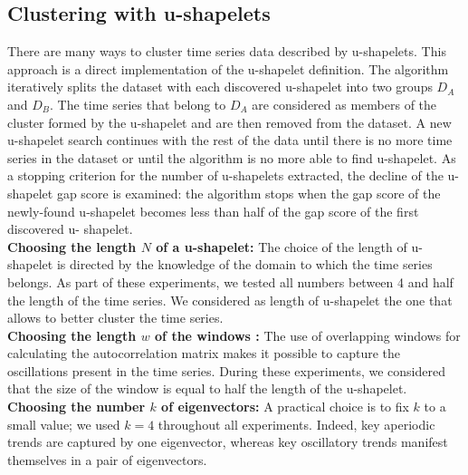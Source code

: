 \subsection{Clustering with u-shapelets}
There are many ways to cluster time series data described by u-shapelets. This approach is a direct implementation of the u-shapelet definition. The algorithm iteratively splits the dataset with each discovered u-shapelet into two groups $D_A$ and $D_B$. The time series that belong to $D_A$ are considered as members of the cluster formed by the u-shapelet and are then removed from the dataset. A new u-shapelet search continues with the rest of the data until there is no more time series in the dataset or until the algorithm is no more able to find u-shapelet. As a stopping criterion for the number of u-shapelets extracted, the decline of the u-shapelet gap score is examined: the algorithm stops when the gap score of the newly-found u-shapelet becomes less than half of the gap score of the first discovered u- shapelet. 
\\
\textbf{Choosing the length $N$ of a u-shapelet: }
The choice of the length of u-shapelet is directed by the knowledge of the
domain to which the time series belongs. As part of these experiments, we tested all  numbers between 4 and half the length of the time series. We considered as length of u-shapelet the one that allows to better cluster the time series.
\\
\textbf{Choosing the length $w$ of the windows : }
The use of overlapping windows for calculating the autocorrelation matrix makes
it possible to capture the oscillations present in the time series. During these experiments, we considered that the size of the window is equal to half the length of the u-shapelet.
\\
\textbf{Choosing  the number $k$ of eigenvectors: }
A practical choice is to fix $k$ to a small value; we used $k = 4$ throughout all
experiments. Indeed, key aperiodic trends are captured by one eigenvector,
whereas key oscillatory trends manifest themselves in a pair of eigenvectors.  

